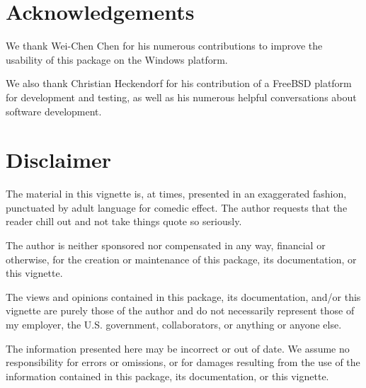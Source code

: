 \section*{Acknowledgements}

We thank Wei-Chen Chen for his numerous contributions to improve the usability of this package on the Windows platform.  

We also thank Christian Heckendorf for his contribution of a FreeBSD platform for development and testing, as well as his numerous helpful conversations about software development.


\section*{Disclaimer}

The material in this vignette is, at times, presented in an exaggerated fashion, punctuated by adult language for comedic effect.  The author requests that the reader chill out and not take things quote so seriously.  

The author is neither sponsored nor compensated in any way, financial or otherwise, for the creation or maintenance of this package, its documentation, or this vignette.  

The views and opinions contained in this package, its documentation, and/or this vignette are purely those of the author and do not necessarily represent those of my employer, the U.S. government, collaborators, or anything or anyone else.

The information presented here may be incorrect or out of date.   We assume no responsibility for errors or omissions, or for damages resulting from the use of the information contained in this package, its documentation, or this vignette.
